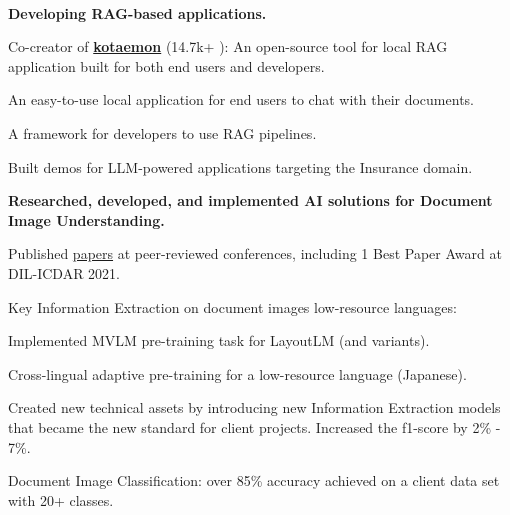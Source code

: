 \\
\begin{xitemize}
    \item \textbf{Developing RAG-based applications.}
    \begin{zitemize}
\item Co-creator of \href{https://github.com/Cinnamon/kotaemon}{\textbf{kotaemon}} ({14.7k+ \scriptsize \faStar}): An
        open-source tool for local RAG application built for both end users and developers.
        \begin{zitemize}
            \vspace{1ex}
            \item An easy-to-use local application for end users to chat with their documents.
            \item A framework for developers to use RAG pipelines.
        \end{zitemize}
        \item Built demos for LLM-powered applications targeting the Insurance domain.
    \end{zitemize}
    \item \textbf{Researched, developed, and implemented AI solutions for Document Image Understanding.}
    \begin{zitemize}
        \item Published \href{https://scholar.google.com/citations?user=\gscholarid}{papers} at
        peer-reviewed conferences, including 1 Best Paper Award at DIL-ICDAR 2021.
        \item Key Information Extraction on document images low-resource languages:
        \vspace{1ex}
        \begin{zitemize}
            \item Implemented MVLM pre-training task for LayoutLM (and variants).
            \item Cross-lingual adaptive pre-training for a low-resource language (Japanese).
            \item Created new technical assets by introducing new Information Extraction models that
            became the new standard for client projects. Increased the f1-score by 2\% - 7\%.
        \end{zitemize}
        \item Document Image Classification: over 85\% accuracy achieved on a client data set with 20+ classes.

\end{zitemize}
\end{xitemize}
